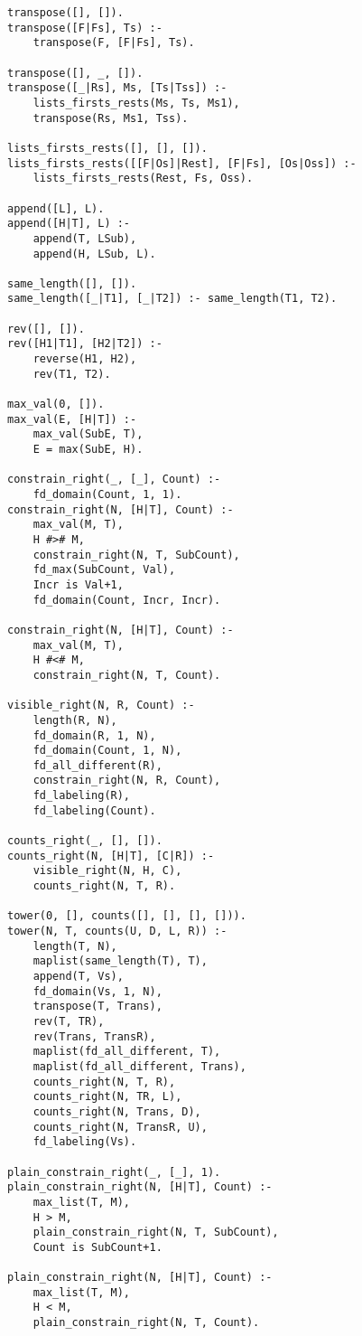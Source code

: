 \documentclass[8pt,twocolumn]{article}
\begin{document}
\begin{verbatim}
transpose([], []).
transpose([F|Fs], Ts) :-
    transpose(F, [F|Fs], Ts).

transpose([], _, []).
transpose([_|Rs], Ms, [Ts|Tss]) :-
    lists_firsts_rests(Ms, Ts, Ms1),
    transpose(Rs, Ms1, Tss).

lists_firsts_rests([], [], []).
lists_firsts_rests([[F|Os]|Rest], [F|Fs], [Os|Oss]) :-
    lists_firsts_rests(Rest, Fs, Oss).

append([L], L).
append([H|T], L) :-
    append(T, LSub),
    append(H, LSub, L).

same_length([], []).
same_length([_|T1], [_|T2]) :- same_length(T1, T2).

rev([], []).
rev([H1|T1], [H2|T2]) :-
    reverse(H1, H2),
    rev(T1, T2).

max_val(0, []).
max_val(E, [H|T]) :-
    max_val(SubE, T),
    E = max(SubE, H).

constrain_right(_, [_], Count) :-
    fd_domain(Count, 1, 1).
constrain_right(N, [H|T], Count) :-
    max_val(M, T),
    H #># M,
    constrain_right(N, T, SubCount),
    fd_max(SubCount, Val),
    Incr is Val+1,
    fd_domain(Count, Incr, Incr).

constrain_right(N, [H|T], Count) :-
    max_val(M, T),
    H #<# M,
    constrain_right(N, T, Count).

visible_right(N, R, Count) :-
    length(R, N),
    fd_domain(R, 1, N),
    fd_domain(Count, 1, N),
    fd_all_different(R),
    constrain_right(N, R, Count),
    fd_labeling(R),
    fd_labeling(Count).

counts_right(_, [], []).
counts_right(N, [H|T], [C|R]) :-
    visible_right(N, H, C),
    counts_right(N, T, R).

tower(0, [], counts([], [], [], [])).
tower(N, T, counts(U, D, L, R)) :-
    length(T, N),
    maplist(same_length(T), T),
    append(T, Vs),
    fd_domain(Vs, 1, N),
    transpose(T, Trans),
    rev(T, TR),
    rev(Trans, TransR),
    maplist(fd_all_different, T),
    maplist(fd_all_different, Trans),
    counts_right(N, T, R),
    counts_right(N, TR, L),
    counts_right(N, Trans, D),
    counts_right(N, TransR, U),
    fd_labeling(Vs).

plain_constrain_right(_, [_], 1).
plain_constrain_right(N, [H|T], Count) :-
    max_list(T, M),
    H > M,
    plain_constrain_right(N, T, SubCount),
    Count is SubCount+1.

plain_constrain_right(N, [H|T], Count) :-
    max_list(T, M),
    H < M,
    plain_constrain_right(N, T, Count).


\end{verbatim}
\end{document}
